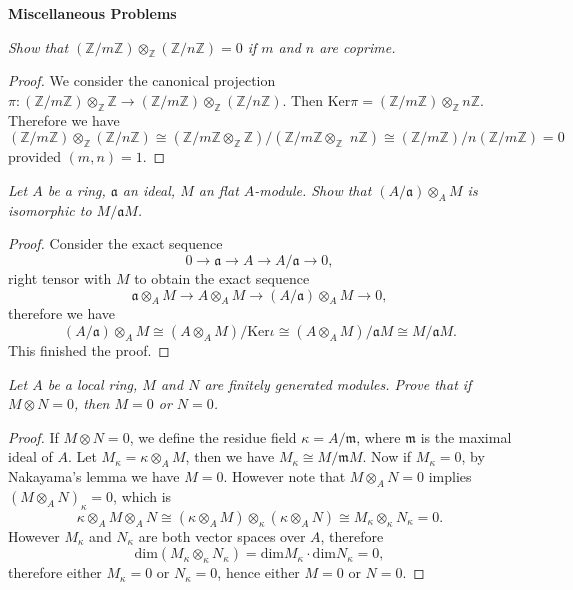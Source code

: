 \begin{center}
\begin{large}
    \textbf{Miscellaneous Problems}
\end{large}
\end{center}
\begin{problem}\em
Show that $(\mathbb{Z}/m\mathbb{Z})\otimes_\mathbb{Z}(\mathbb{Z}/n\mathbb{Z})=0$ if $m$ and $n$ are coprime.
\end{problem}
\begin{proof}
We consider the canonical projection $\pi:(\mathbb{Z}/m\mathbb{Z})\otimes_\mathbb{Z}\mathbb{Z}\to(\mathbb{Z}/m\mathbb{Z})\otimes_\mathbb{Z}(\mathbb{Z}/n\mathbb{Z})$. Then $\mathrm{Ker}\pi=(\mathbb{Z}/m\mathbb{Z})\otimes_\mathbb{Z}n\mathbb{Z}$. Therefore we have 
$$
\left( \mathbb{Z} /m\mathbb{Z} \right) \otimes _{\mathbb{Z}}\left( \mathbb{Z} /n\mathbb{Z} \right) \cong \left( \mathbb{Z} /m\mathbb{Z} \otimes _{\mathbb{Z}}\mathbb{Z} \right) /\left( \mathbb{Z} /m\mathbb{Z} \otimes _{\mathbb{Z}}\,\,n\mathbb{Z} \right) \cong \left( \mathbb{Z} /m\mathbb{Z} \right) /n\left( \mathbb{Z} /m\mathbb{Z} \right) =0
$$
provided $(m,n)=1$.
\end{proof}
\begin{problem}\em
Let $A$ be a ring, $\mathfrak{a}$ an ideal, $M$ an flat $A$-module. Show that $(A/\mathfrak{a})\otimes_AM$ is isomorphic to $M/\mathfrak{a}M$.
\end{problem}
\begin{proof}
Consider the exact sequence 
$$
0\longrightarrow \mathfrak{a} \longrightarrow A\longrightarrow A/\mathfrak{a} \longrightarrow 0,
$$
right tensor with $M$ to obtain the exact sequence 
$$
\mathfrak{a} \otimes _AM\longrightarrow A\otimes _AM\longrightarrow \left( A/\mathfrak{a} \right) \otimes _AM\longrightarrow 0,
$$
therefore we have 
$$
\left( A/\mathfrak{a} \right) \otimes _AM\cong \left( A\otimes _AM \right) /\mathrm{Ker}\iota \cong \left( A\otimes _AM \right) /\mathfrak{a} M\cong M/\mathfrak{a} M.
$$
This finished the proof.
\end{proof}
\begin{problem}\em
Let $A$ be a local ring, $M$ and $N$ are finitely generated modules. Prove that if $M\otimes N=0$, then $M=0$ or $N=0$.
\end{problem}
\begin{proof}
If $M\otimes N=0$, we define the residue field $\kappa=A/\mathfrak{m}$, where $\mathfrak{m}$ is the maximal ideal of $A$. Let $M_\kappa=\kappa\otimes_AM$, then we have $M_\kappa\cong M/\mathfrak{m}M$. Now if $M_\kappa=0$, by Nakayama's lemma we have $M=0$. However note that $M\otimes_AN=0$ implies $(M\otimes_AN)_\kappa=0$, which is 
$$
\kappa \otimes _AM\otimes _AN\cong \left( \kappa \otimes _AM \right) \otimes _{\kappa}\left( \kappa \otimes _AN \right) \cong M_{\kappa}\otimes _{\kappa}N_{\kappa}=0.
$$
However $M_\kappa$ and $N_\kappa$ are both vector spaces over $A$, therefore 
$$
\mathrm{dim}\left( M_{\kappa}\otimes _{\kappa}N_{\kappa} \right) =\mathrm{dim}M_{\kappa}\cdot \mathrm{dim}N_{\kappa}=0,
$$
therefore either $M_\kappa=0$ or $N_\kappa=0$, hence either $M=0$ or $N=0$.
\end{proof}
